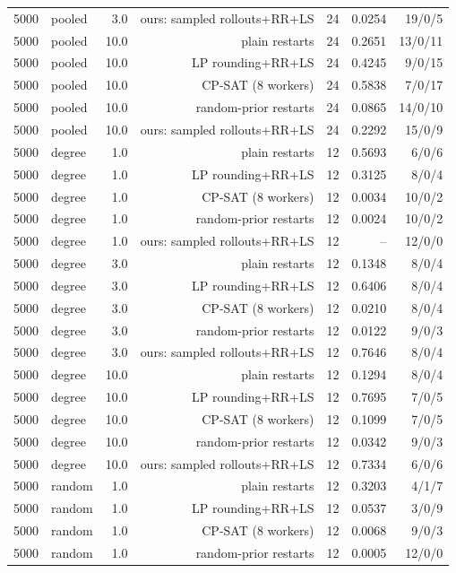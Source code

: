 \begin{table}[t]
\begin{tabular}{llrrrrr}
5000 & pooled & 3.0 & ours: sampled rollouts+RR+LS & 24 & 0.0254 & 19/0/5 \\
5000 & pooled & 10.0 & plain restarts & 24 & 0.2651 & 13/0/11 \\
5000 & pooled & 10.0 & LP rounding+RR+LS & 24 & 0.4245 & 9/0/15 \\
5000 & pooled & 10.0 & CP-SAT (8 workers) & 24 & 0.5838 & 7/0/17 \\
5000 & pooled & 10.0 & random-prior restarts & 24 & 0.0865 & 14/0/10 \\
5000 & pooled & 10.0 & ours: sampled rollouts+RR+LS & 24 & 0.2292 & 15/0/9 \\
5000 & degree & 1.0 & plain restarts & 12 & 0.5693 & 6/0/6 \\
5000 & degree & 1.0 & LP rounding+RR+LS & 12 & 0.3125 & 8/0/4 \\
5000 & degree & 1.0 & CP-SAT (8 workers) & 12 & 0.0034 & 10/0/2 \\
5000 & degree & 1.0 & random-prior restarts & 12 & 0.0024 & 10/0/2 \\
5000 & degree & 1.0 & ours: sampled rollouts+RR+LS & 12 & -- & 12/0/0 \\
5000 & degree & 3.0 & plain restarts & 12 & 0.1348 & 8/0/4 \\
5000 & degree & 3.0 & LP rounding+RR+LS & 12 & 0.6406 & 8/0/4 \\
5000 & degree & 3.0 & CP-SAT (8 workers) & 12 & 0.0210 & 8/0/4 \\
5000 & degree & 3.0 & random-prior restarts & 12 & 0.0122 & 9/0/3 \\
5000 & degree & 3.0 & ours: sampled rollouts+RR+LS & 12 & 0.7646 & 8/0/4 \\
5000 & degree & 10.0 & plain restarts & 12 & 0.1294 & 8/0/4 \\
5000 & degree & 10.0 & LP rounding+RR+LS & 12 & 0.7695 & 7/0/5 \\
5000 & degree & 10.0 & CP-SAT (8 workers) & 12 & 0.1099 & 7/0/5 \\
5000 & degree & 10.0 & random-prior restarts & 12 & 0.0342 & 9/0/3 \\
5000 & degree & 10.0 & ours: sampled rollouts+RR+LS & 12 & 0.7334 & 6/0/6 \\
5000 & random & 1.0 & plain restarts & 12 & 0.3203 & 4/1/7 \\
5000 & random & 1.0 & LP rounding+RR+LS & 12 & 0.0537 & 3/0/9 \\
5000 & random & 1.0 & CP-SAT (8 workers) & 12 & 0.0068 & 9/0/3 \\
5000 & random & 1.0 & random-prior restarts & 12 & 0.0005 & 12/0/0 \\

\end{tabular}
\end{table}
